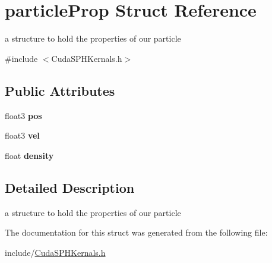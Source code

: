 \hypertarget{structparticle_prop}{\section{particle\-Prop Struct Reference}
\label{structparticle_prop}
}


a structure to hold the properties of our particle  




{\ttfamily \#include $<$Cuda\-S\-P\-H\-Kernals.\-h$>$}

\subsection*{Public Attributes}
\begin{DoxyCompactItemize}
\item 
\hypertarget{structparticle_prop_a05f3d0c824b9eeae21c00f72ea414099}{float3 {\bfseries pos}}\label{structparticle_prop_a05f3d0c824b9eeae21c00f72ea414099}

\item 
\hypertarget{structparticle_prop_aa762b3243befb09ff17ccc4962af8dea}{float3 {\bfseries vel}}\label{structparticle_prop_aa762b3243befb09ff17ccc4962af8dea}

\item 
\hypertarget{structparticle_prop_ac94355e032cf4dfc6fc432719ece340b}{float {\bfseries density}}\label{structparticle_prop_ac94355e032cf4dfc6fc432719ece340b}

\end{DoxyCompactItemize}


\subsection{Detailed Description}
a structure to hold the properties of our particle 

The documentation for this struct was generated from the following file\-:\begin{DoxyCompactItemize}
\item 
include/\hyperlink{_cuda_s_p_h_kernals_8h}{Cuda\-S\-P\-H\-Kernals.\-h}\end{DoxyCompactItemize}
